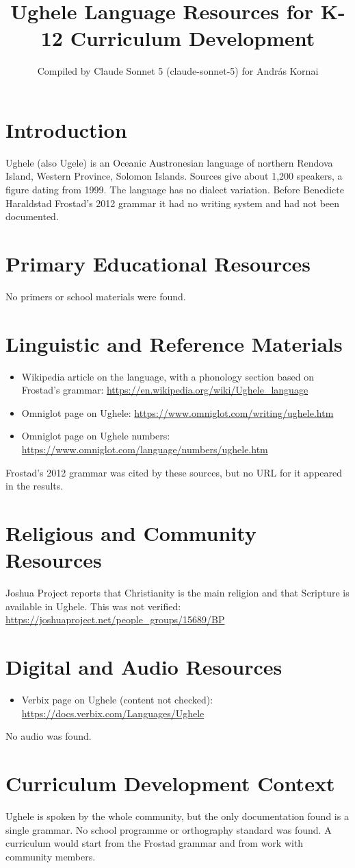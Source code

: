 \documentclass[12pt]{article}
\title{Ughele Language Resources for K-12 Curriculum Development}
\author{Compiled by Claude Sonnet 5 (claude-sonnet-5) for Andr\'as Kornai}
\date{}
\begin{document}
\maketitle
\section{Introduction}
Ughele (also Ugele) is an Oceanic Austronesian language of northern Rendova Island, Western Province, Solomon Islands. Sources give about 1,200 speakers, a figure dating from 1999. The language has no dialect variation. Before Benedicte Haraldstad Frostad's 2012 grammar it had no writing system and had not been documented.
\section{Primary Educational Resources}
No primers or school materials were found.
\section{Linguistic and Reference Materials}
\begin{itemize}
\item Wikipedia article on the language, with a phonology section based on Frostad's grammar: \url{https://en.wikipedia.org/wiki/Ughele_language}
\item Omniglot page on Ughele: \url{https://www.omniglot.com/writing/ughele.htm}
\item Omniglot page on Ughele numbers: \url{https://www.omniglot.com/language/numbers/ughele.htm}
\end{itemize}
Frostad's 2012 grammar was cited by these sources, but no URL for it appeared in the results.
\section{Religious and Community Resources}
Joshua Project reports that Christianity is the main religion and that Scripture is available in Ughele. This was not verified: \url{https://joshuaproject.net/people_groups/15689/BP}
\section{Digital and Audio Resources}
\begin{itemize}
\item Verbix page on Ughele (content not checked): \url{https://docs.verbix.com/Languages/Ughele}
\end{itemize}
No audio was found.
\section{Curriculum Development Context}
Ughele is spoken by the whole community, but the only documentation found is a single grammar. No school programme or orthography standard was found. A curriculum would start from the Frostad grammar and from work with community members.
\end{document}
